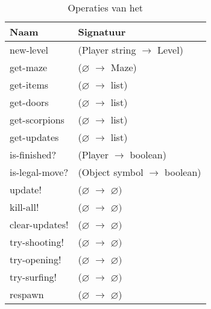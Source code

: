 \begin{table}[hbt]
\centering
\begin{tabular}{|ll|}
\hline
\rowcolor[HTML]{000000} 
{\color[HTML]{FFFFFF} \textbf{Naam}} & {\color[HTML]{FFFFFF} \textbf{Signatuur}} \\ \hline
new-level      & (Player string $\rightarrow$ Level)   \\ \hline
get-maze       & ($\varnothing$ $\rightarrow$ Maze)                        \\ \hline
get-items       & ($\varnothing$ $\rightarrow$ list)                        \\ \hline
get-doors       & ($\varnothing$ $\rightarrow$ list)                        \\ \hline
get-scorpions  & ($\varnothing$ $\rightarrow$ list)                        \\ \hline
get-updates    & ($\varnothing$ $\rightarrow$ list)                        \\ \hline
is-finished?   & (Player $\rightarrow$ boolean)                            \\ \hline
is-legal-move? & (Object\footnotemark{} symbol $\rightarrow$ boolean)      \\ \hline
update!        & ($\varnothing$ $\rightarrow$ $\varnothing)$               \\ \hline
kill-all!        & ($\varnothing$ $\rightarrow$ $\varnothing)$               \\ \hline
clear-updates!        & ($\varnothing$ $\rightarrow$ $\varnothing)$               \\ \hline
try-shooting!        & ($\varnothing$ $\rightarrow$ $\varnothing)$               \\ \hline
try-opening!        & ($\varnothing$ $\rightarrow$ $\varnothing)$               \\ \hline
try-surfing!        & ($\varnothing$ $\rightarrow$ $\varnothing)$               \\ \hline
respawn        & ($\varnothing$ $\rightarrow$ $\varnothing$)               \\ \hline
\end{tabular}
\caption{Operaties van het \texttt{}}
\label{table:level}
\end{table}



